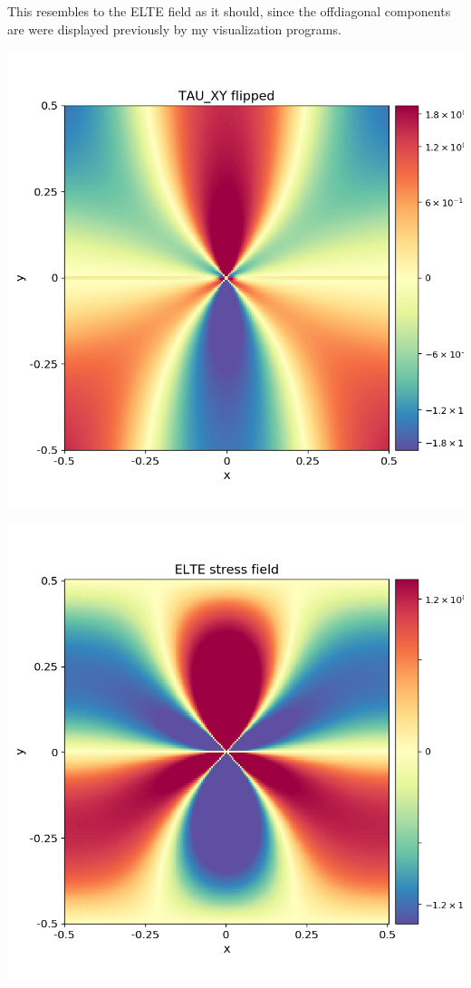 \documentclass[12pt,a4paper]{article}
\theoremstyle{plain}
\begin{document}
\begin{multicols*}{2}
	\par This resembles to the ELTE field as it should, since the offdiagonal
	components are were displayed previously by my visualization programs.

	\begin{minipage}[t]{0.42\columnwidth}
		\centering
		\includegraphics[width=0.8\columnwidth]{elte_stress_field_TAU_XY_flipped.png}
	\end{minipage}
	\begin{minipage}[t]{0.42\columnwidth}
		\centering
		\includegraphics[width=0.8\columnwidth]{elte_stress_field.png}
	\end{minipage}


\end{multicols*}
\end{document}
